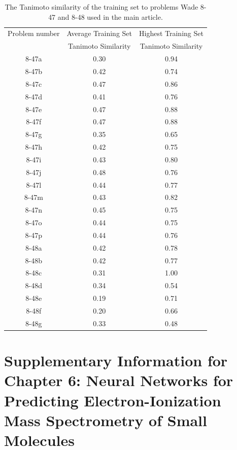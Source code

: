 \begin{table}[ht]\label{tab:problem_training_similarity}
\centering
\caption{The Tanimoto similarity of the training set to problems Wade 8-47 and 8-48 used in the main article.}
\begin{tabular}{ccc}
\hline
 Problem number & Average Training Set & Highest Training Set \\
  & Tanimoto Similarity & Tanimoto Similarity \\
\hline
8-47a&0.30&0.94\\
8-47b&0.42&0.74\\
8-47c&0.47&0.86\\
8-47d&0.41&0.76\\
8-47e&0.47&0.88\\
8-47f&0.47&0.88\\
8-47g&0.35&0.65\\
8-47h&0.42&0.75\\
8-47i&0.43&0.80\\
8-47j&0.48&0.76\\
8-47l&0.44&0.77\\
8-47m&0.43&0.82\\
8-47n&0.45&0.75\\
8-47o&0.44&0.75\\
8-47p&0.44&0.76\\
\hline
8-48a&0.42&0.78\\
8-48b&0.42&0.77\\
8-48c&0.31&1.00\\
8-48d&0.34&0.54\\
8-48e&0.19&0.71\\
8-48f&0.20&0.66\\
8-48g&0.33&0.48\\
\hline
\end{tabular}
\end{table}


\section{Supplementary Information for Chapter 6: Neural Networks for Predicting Electron-Ionization Mass Spectrometry of Small Molecules}

